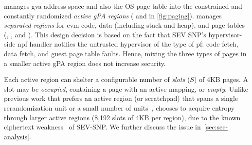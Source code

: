 


\label{subsubsec:active-regions}
\thename manages \gls{gva} address space and also the OS page table into the constrained and constantly randomized \emph{active gPA regions} ( and  in \autoref{fig:paging}).
\thename manages  \emph{separated regions} for \gls{cvm} code, data (including stack and heap), and page tables (, , and ).
This design decision is based on the fact that SEV SNP's hypervisor-side  \gls{npf} handler notifies the untrusted hypervisor of the type of \gls{pf}: code fetch, data fetch, and guest page table faults.
Hence, mixing the three types of pages in a smaller active gPA region does not increase security.

Each active region can shelter a configurable number of \emph{slots} ($S$) of 4KB pages.
A slot may be \emph{occupied}, containing a page with an active mapping, or \emph{empty}.
Unlike previous work that prefers an active region (or scratchpad) that spans a single rerandomization unit or a small number of units~\cite{zhang2020klotski,obelix}, \thename chooses to acquire entropy through larger active regions (8,192 slots of 4KB per region), due to the known ciphertext weakness~\cite{li2021cipherleaks} of SEV-SNP.
We further discuss the issue in~\cref{sec:sec-analysis}.

